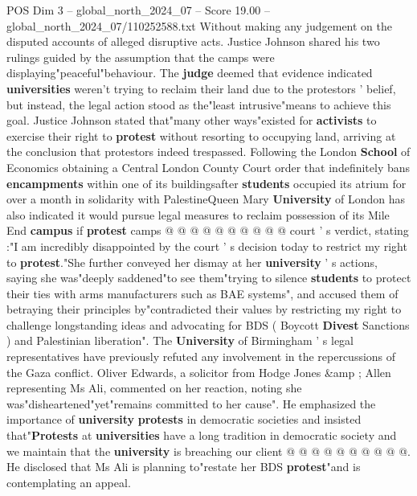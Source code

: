 \begin{textsample}{POS Dim 3 – global\_north\_2024\_07 – Score 19.00 – global\_north\_2024\_07/110252588.txt}
Without making any judgement on the disputed accounts of alleged disruptive acts.
Justice Johnson shared his two rulings guided by the assumption that the camps were displaying"peaceful"behaviour.
The \textbf{judge} deemed that evidence indicated \textbf{universities} weren't trying to reclaim their land due to the protestors ' belief, but instead, the legal action stood as the"least intrusive"means to achieve this goal.
Justice Johnson stated that"many other ways"existed for \textbf{activists} to exercise their right to \textbf{protest} without resorting to occupying land, arriving at the conclusion that protestors indeed trespassed.
Following the London \textbf{School} of Economics obtaining a Central London County Court order that indefinitely bans \textbf{encampments} within one of its buildingsafter \textbf{students} occupied its atrium for over a month in solidarity with PalestineQueen Mary \textbf{University} of London has also indicated it would pursue legal measures to reclaim possession of its Mile End \textbf{campus} if \textbf{protest} camps @ @ @ @ @ @ @ @ @ @ court ' s verdict, stating :"I am incredibly disappointed by the court ' s decision today to restrict my right to \textbf{protest}."She further conveyed her dismay at her \textbf{university} ' s actions, saying she was"deeply saddened"to see them"trying to silence \textbf{students} to protect their ties with arms manufacturers such as BAE systems", and accused them of betraying their principles by"contradicted their values by restricting my right to challenge longstanding ideas and advocating for BDS ( Boycott \textbf{Divest} Sanctions ) and Palestinian liberation".
The \textbf{University} of Birmingham ' s legal representatives have previously refuted any involvement in the repercussions of the Gaza conflict.
Oliver Edwards, a solicitor from Hodge Jones \&amp ; Allen representing Ms Ali, commented on her reaction, noting she was"disheartened"yet"remains committed to her cause".
He emphasized the importance of \textbf{university} \textbf{protests} in democratic societies and insisted that"\textbf{Protests} at \textbf{universities} have a long tradition in democratic society and we maintain that the \textbf{university} is breaching our client @ @ @ @ @ @ @ @ @ @.
He disclosed that Ms Ali is planning to"restate her BDS \textbf{protest}"and is contemplating an appeal.

\end{textsample}
